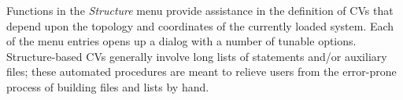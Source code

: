 \documentclass[preprint,review,11pt]{elsarticle}
\begin{document}

Functions in the \emph{Structure} menu provide assistance in the
definition of CVs that depend upon the topology and coordinates of
the currently loaded system.  Each of the menu entries opens up a
dialog with a number of tunable options. Structure-based CVs
generally involve long lists of statements and/or auxiliary files;
these automated procedures are meant to relieve users from the error-prone
process of building files and lists by hand.



\begin{figure}
  \centering

\end{figure}
\end{document}
